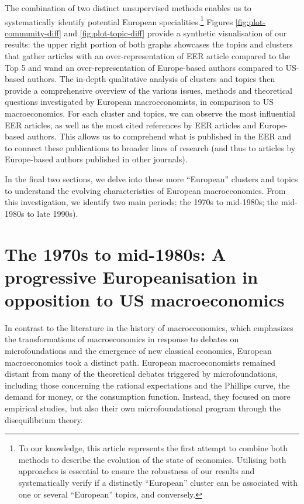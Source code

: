 \documentclass[
  12pt,
  onecolumn]{article}
\begin{document}
The combination of two distinct unsupervised methods enables us to
systematically identify potential European specialities.\footnote{To our
  knowledge, this article represents the first attempt to combine both
  methods to describe the evolution of the state of economics. Utilising
  both approaches is essential to ensure the robustness of our results
  and systematically verify if a distinctly ``European'' cluster can be
  associated with one or several ``European'' topics, and conversely.}
Figures \ref{fig:plot-community-diff} and \ref{fig:plot-topic-diff}
provide a synthetic visualisation of our results: the upper right
portion of both graphs showcases the topics and clusters that gather
articles with an over-representation of EER article compared to the Top
5 and wand an over-representation of Europe-based authors compared to
US-based authors. The in-depth qualitative analysis of clusters and
topics then provide a comprehensive overview of the various issues,
methods and theoretical questions investigated by European
macroeconomists, in comparison to US macroeconomics. For each cluster
and topics, we can observe the most influential EER articles, as well as
the most cited references by EER articles and Europe-based authors. This
allows us to comprehend what is published in the EER and to connect
these publications to broader lines of research (and thus to articles by
Europe-based authors published in other journals).

In the final two sections, we delve into these more ``European''
clusters and topics to understand the evolving characteristics of
European macroeconomics. From this investigation, we identify two main
periods: the 1970s to mid-1980s; the mid-1980s to late 1990s).

\hypertarget{the-1970s-to-mid-1980s-a-progressive-europeanisation-in-opposition-to-us-macroeconomics}{%
\section{The 1970s to mid-1980s: A progressive Europeanisation in
opposition to US
macroeconomics}\label{the-1970s-to-mid-1980s-a-progressive-europeanisation-in-opposition-to-us-macroeconomics}}

In contrast to the literature in the history of macroeconomics, which
emphasizes the transformations of macroeconomics in response to debates
on microfoundations and the emergence of new classical economics,
European macroeconomics took a distinct path. European macroeconomists
remained distant from many of the theoretical debates triggered by
microfoundations, including those concerning the rational expectations
and the Phillips curve, the demand for money, or the consumption
function. Instead, they focused on more empirical studies, but also
their own microfoundational program through the disequilibrium theory.
\end{document}
